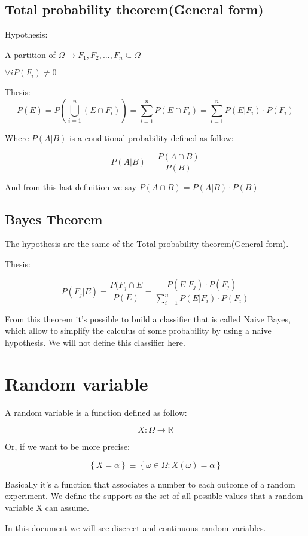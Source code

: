 \documentclass{article}
\begin{document}
\subsection{Total probability theorem(General form)}

Hypothesis:
\bigskip

A partition of $\Omega \longrightarrow F_1,F_2,...,F_n \subseteq \Omega$ 

$\forall i P(F_i) \neq 0$
\bigskip

Thesis:
$$P(E) = P(\bigcup_{i=1}^n (E \cap F_i)) = \sum_{i=1}^n P(E \cap F_i) = \sum_{i=1}^nP(E|F_i)\cdot P(F_i)$$

Where $P(A|B)$ is a conditional probability defined as follow:

$$P(A|B) = \frac{P(A \cap B)}{P(B)}$$

And from this last definition we say $P(A \cap B) = P(A|B) \cdot P(B)$ 

\subsection{Bayes Theorem}

The hypothesis are the same of the Total probability theorem(General form).
\bigskip

Thesis:

$$P(F_j|E) = \frac{P(F_j \cap E}{P(E)} = \frac{P(E|F_j)\cdot P(F_j)}{\sum_{i=1}^n P(E|F_i) \cdot P(F_i)}$$


From this theorem it's possible to build a classifier that is called Naive Bayes, which allow to simplify the calculus of some probability by using a naive hypothesis. We will not define this classifier here.

\section{Random variable}

A random variable is a function defined as follow:

$$X : \Omega \rightarrow \mathbb{R}$$

Or, if we want to be more precise:

$$\left\{X = \alpha\right\} \equiv \left\{\omega \in \Omega : X(\omega) = \alpha\right\}$$

Basically it's a function that associates a number to each outcome of a random experiment. We define the support as the set of all possible values that a random variable X can assume. 

In this document we will see discreet and continuous random variables.
\bigskip
\end{document}
